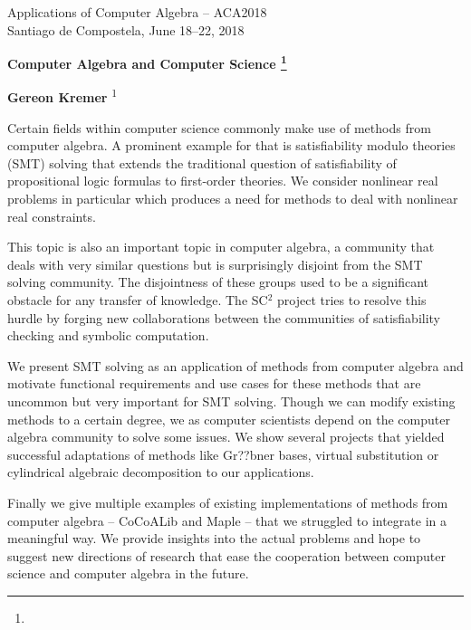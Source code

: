 \documentclass{article}
\makeatletter
\newcommand{\TITLE}[2][]{
  \begin{center} \Large \bfseries #2%
  \def\@temp{#1}\ifx\@temp\@empty\relax\else\footnote{#1}\fi\end{center}}
\newcommand{\AUTHOR}[2][]{\textbf{#2}%
  \def\@temp{#1}\ifx\@temp\@empty\relax\else\textsuperscript{#1}\fi}
\newcommand{\HEADING}{
{\noindent \small Applications of Computer Algebra -- ACA2018 \\
Santiago de Compostela, June 18--22, 2018} \vspace{10pt}}
\makeatother
\begin{document}
\HEADING


\TITLE{Computer Algebra and Computer Science}



\begin{center}
 \AUTHOR[1]{Gereon Kremer}
\end{center}



Certain fields within computer science commonly make use of methods from computer algebra.
A prominent example for that is satisfiability modulo theories (SMT) solving that extends the traditional question of satisfiability of propositional logic formulas to first-order theories.
We consider nonlinear real problems in particular which produces a need for methods to deal with nonlinear real constraints.

This topic is also an important topic in computer algebra, a community that deals with very similar questions but is surprisingly disjoint from the SMT solving community.
The disjointness of these groups used to be a significant obstacle for any transfer of knowledge.
The SC$^2$ project tries to resolve this hurdle by forging new collaborations between the communities of satisfiability checking and symbolic computation.

We present SMT solving as an application of methods from computer algebra and motivate functional requirements and use cases for these methods that are uncommon but very important for SMT solving.
Though we can modify existing methods to a certain degree, we as computer scientists depend on the computer algebra community to solve some issues.
We show several projects that yielded successful adaptations of methods like Gr??bner bases\cite{Junges2013}, virtual substitution\cite{Corzilius2011} or cylindrical algebraic decomposition\cite{Kremer2016} to our applications.

Finally we give multiple examples of existing implementations of methods from computer algebra -- CoCoALib and Maple -- that we struggled to integrate in a meaningful way.
We provide insights into the actual problems and hope to suggest new directions of research that ease the cooperation between computer science and computer algebra in the future.
\end{document}
